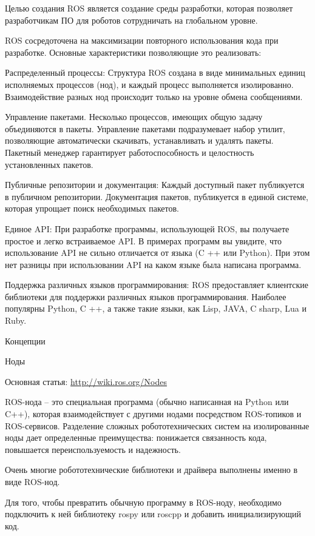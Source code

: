 Целью создания ROS является создание среды разработки, которая позволяет разработчикам ПО для роботов сотрудничать на глобальном уровне.

ROS сосредоточена на максимизации повторного использования кода при разработке. Основные характеристики позволяющие это реализовать:

Распределенный процессы: Структура ROS создана в виде минимальных единиц исполняемых процессов (нод), и каждый процесс выполняется изолированно. Взаимодействие разных нод происходит только на уровне обмена сообщениями.

Управление пакетами. Несколько процессов, имеющих общую задачу объединяются в пакеты. Управление пакетами подразумевает набор утилит, позволяющие автоматически скачивать, устанавливать и удалять пакеты. Пакетный менеджер гарантирует работоспособность и целостность установленных пакетов.

Публичные репозитории и документация: Каждый доступный пакет публикуется в публичном репозитории. Документация пакетов, публикуется в единой системе, которая упрощает поиск необходимых пакетов.

Единое API: При разработке программы, использующей ROS, вы получаете простое и легко встраиваемое API. В примерах программ вы увидите, что использование API не сильно отличается от языка (C ++ или Python). При этом нет разницы при использовании API на каком языке была написана программа.

Поддержка различных языков программирования: ROS предоставляет клиентские библиотеки для поддержки различных языков программирования. Наиболее популярны Python, C ++, а также такие языки, как Lisp, JAVA, C sharp, Lua и Ruby.

Концепции

Ноды

Основная статья: \url{http://wiki.ros.org/Nodes}

ROS-нода – это специальная программа (обычно написанная на Python или C++), которая взаимодействует с другими нодами посредством ROS-топиков и ROS-сервисов. Разделение сложных робототехнических систем на изолированные ноды дает определенные преимущества: понижается связанность кода, повышается переиспользуемость и надежность.

Очень многие робототехнические библиотеки и драйвера выполнены именно в виде ROS-нод.

Для того, чтобы превратить обычную программу в ROS-ноду, необходимо подключить к ней библиотеку rospy или roscpp и добавить инициализирующий код.

